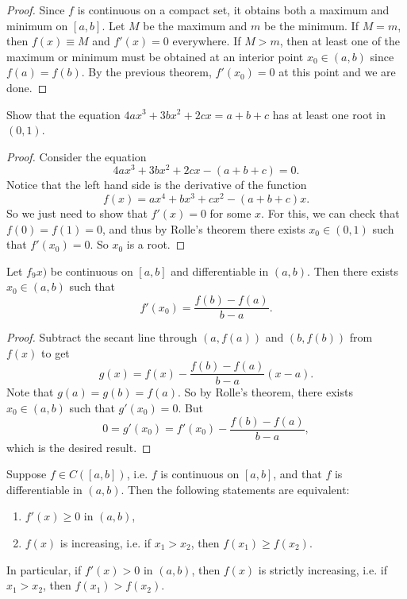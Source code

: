 \begin{proof}
  Since $f$ is continuous on a compact set, it obtains
  both a maximum and minimum on $[a, b]$. Let
  $M$ be the maximum and $m$ be the minimum. If
  $M = m$, then $f(x) \equiv M$ and $f'(x) = 0$
  everywhere. If $M > m$, then at least one of the maximum
  or minimum must be obtained at an interior point
  $x_0 \in (a, b)$ since $f(a) = f(b)$. By the previous
  theorem, $f'(x_0) = 0$ at this point and we are done.
\end{proof}

\begin{example}
  Show that the equation
  $4ax^3 + 3bx^2 + 2cx = a + b + c$ has at least one
  root in $(0, 1)$.
\end{example}

\begin{proof}
  Consider the equation
  \[
    4ax^3 + 3bx^2 + 2cx - (a + b + c) = 0.
  \]
  Notice that the left hand side is the derivative
  of the function
  \[f(x) = ax^4 + bx^3 + cx^2 - (a + b + c)x.\]
  So we just need to show that $f'(x) = 0$ for some
  $x$. For this, we can check that $f(0) = f(1) = 0$,
  and thus by Rolle's theorem there exists
  $x_0 \in (0, 1)$ such that $f'(x_0) = 0$. So
  $x_0$ is a root.
\end{proof}

\begin{theorem}
  Let $f_9x)$ be continuous on $[a, b]$ and differentiable
  in $(a, b)$. Then there exists $x_0 \in (a, b)$
  such that
  \[f'(x_0) = \frac{f(b) - f(a)}{b - a}.\]
\end{theorem}

\begin{proof}
  Subtract the secant line through $(a, f(a))$ and
  $(b, f(b))$ from $f(x)$ to get
  \[g(x) = f(x) - \frac{f(b) - f(a)}{b - a} (x - a).\]
  Note that $g(a) = g(b) = f(a)$. So by Rolle's theorem,
  there exists $x_0 \in (a, b)$ such that $g'(x_0) = 0$.
  But
  \[
    0 = g'(x_0) = f'(x_0) - \frac{f(b) - f(a)}{b - a},
  \]
  which is the desired result.
\end{proof}

\begin{corollary}
  Suppose $f \in C([a, b])$, i.e. $f$ is continuous
  on $[a, b]$, and that $f$ is differentiable in
  $(a, b)$. Then the following statements are equivalent:
  \begin{enumerate}
    \item $f'(x) \ge 0$ in $(a, b)$,
    \item $f(x)$ is increasing, i.e. if $x_1 > x_2$,
      then $f(x_1) \ge f(x_2)$.
  \end{enumerate}
  In particular, if $f'(x) > 0$ in $(a, b)$, then
  $f(x)$ is strictly increasing, i.e. if $x_1 > x_2$,
  then $f(x_1) > f(x_2)$.
\end{corollary}

